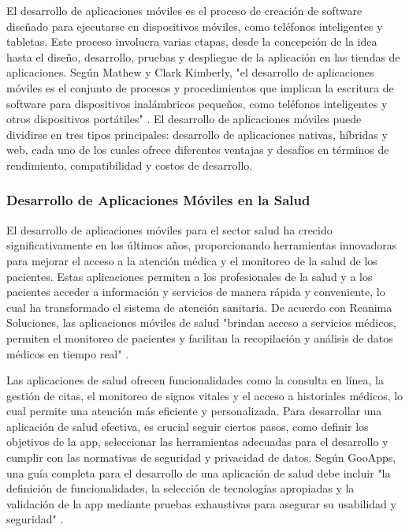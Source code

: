 El desarrollo de aplicaciones móviles es el proceso de creación de software diseñado para ejecutarse en dispositivos móviles, como teléfonos inteligentes y tabletas. Este proceso involucra varias etapas, desde la concepción de la idea hasta el diseño, desarrollo, pruebas y despliegue de la aplicación en las tiendas de aplicaciones. Según Mathew y Clark Kimberly, "el desarrollo de aplicaciones móviles es el conjunto de procesos y procedimientos que implican la escritura de software para dispositivos inalámbricos pequeños, como teléfonos inteligentes y otros dispositivos portátiles" \parencite{mathew2023}. El desarrollo de aplicaciones móviles puede dividirse en tres tipos principales: desarrollo de aplicaciones nativas, híbridas y web, cada uno de los cuales ofrece diferentes ventajas y desafíos en términos de rendimiento, compatibilidad y costos de desarrollo.

\subsubsection{Desarrollo de Aplicaciones Móviles en la Salud}

El desarrollo de aplicaciones móviles para el sector salud ha crecido significativamente en los últimos años, proporcionando herramientas innovadoras para mejorar el acceso a la atención médica y el monitoreo de la salud de los pacientes. Estas aplicaciones permiten a los profesionales de la salud y a los pacientes acceder a información y servicios de manera rápida y conveniente, lo cual ha transformado el sistema de atención sanitaria. De acuerdo con Reanima Soluciones, las aplicaciones móviles de salud "brindan acceso a servicios médicos, permiten el monitoreo de pacientes y facilitan la recopilación y análisis de datos médicos en tiempo real" \parencite{reanima2023}.

Las aplicaciones de salud ofrecen funcionalidades como la consulta en línea, la gestión de citas, el monitoreo de signos vitales y el acceso a historiales médicos, lo cual permite una atención más eficiente y personalizada. Para desarrollar una aplicación de salud efectiva, es crucial seguir ciertos pasos, como definir los objetivos de la app, seleccionar las herramientas adecuadas para el desarrollo y cumplir con las normativas de seguridad y privacidad de datos. Según GooApps, una guía completa para el desarrollo de una aplicación de salud debe incluir "la definición de funcionalidades, la selección de tecnologías apropiadas y la validación de la app mediante pruebas exhaustivas para asegurar su usabilidad y seguridad" \parencite{gooapps2022}.

